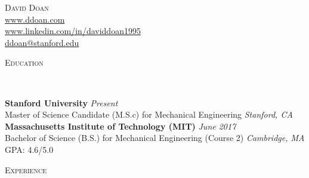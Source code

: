 \documentclass[9pt]{article}
\newenvironment{changemargin}[2]{%
  \begin{list}{}{%
    \setlength{\topsep}{0pt}%
    \setlength{\leftmargin}{#1}%
    \setlength{\rightmargin}{#2}%
    \setlength{\listparindent}{\parindent}%
    \setlength{\itemindent}{\parindent}%
    \setlength{\parsep}{\parskip}%
  }%
  \item[]}{\end{list}
}
\newcommand{\lineover}{
	\begin{changemargin}{-0.05in}{-0.05in}
		\vspace*{-8pt}
		\hrulefill \\
		\vspace*{-2pt}
	\end{changemargin}
}
\newcommand{\header}[1]{
	\begin{changemargin}{-0.5in}{-0.5in}
		\scshape{#1}\\
  	\lineover
	\end{changemargin}
}
\newcommand{\contact}[4]{
	\begin{changemargin}{-0.5in}{-0.5in}
		\begin{center}
			{\Large \scshape {#1}}\\ \smallskip
      {\url{#2}}\\ \smallskip
			{\url{#3}}\\ \smallskip
			{\url{#4}}\\
		\end{center}
	\end{changemargin}
}
\newenvironment{body} {
	\vspace*{-16pt}
	\begin{changemargin}{-0.25in}{-0.5in}
  }	
	{\end{changemargin}
}
\begin{document}
\contact{David Doan}{www.ddoan.com}{www.linkedin.com/in/daviddoan1995}{ddoan@stanford.edu}

\header{Education}

\begin{body}
	\vspace{14pt}
	\textbf{Stanford University}{} \hfill \emph{Present}{} \\
	Master of Science Candidate (M.S.c) for Mechanical Engineering \hfill \emph{Stanford, CA}{} \\
	\medskip
	\textbf{Massachusetts Institute of Technology (MIT)}{} \hfill \emph{June 2017}{} \\
	Bachelor of Science (B.S.) for Mechanical Engineering (Course 2) \hfill \emph{Cambridge, MA}{} \\
	GPA: 4.6/5.0\\
\end{body}
\medskip

\header{Experience}
\end{document}
